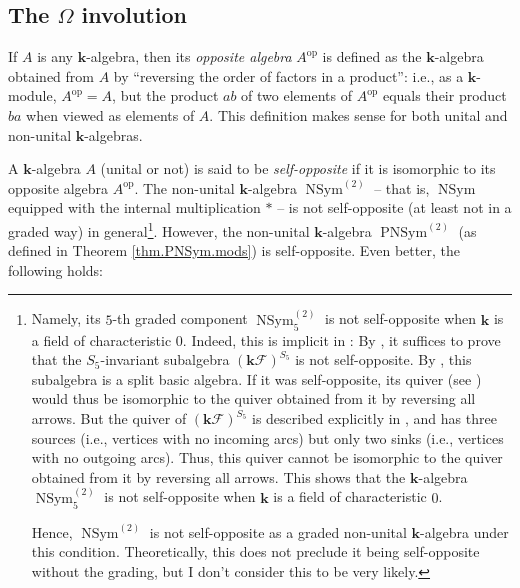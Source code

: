 \documentclass[numbers=enddot,12pt,final,onecolumn,notitlepage]{scrartcl}%
\theoremstyle{definition}
\begin{document}
\subsection{The $\Omega$ involution}

If $A$ is any $\mathbf{k}$-algebra, then its \emph{opposite algebra}
$A^{\operatorname*{op}}$ is defined as the $\mathbf{k}$-algebra obtained from
$A$ by \textquotedblleft reversing the order of factors in a
product\textquotedblright: i.e., as a $\mathbf{k}$-module,
$A^{\operatorname*{op}}=A$, but the product $ab$ of two elements of
$A^{\operatorname*{op}}$ equals their product $ba$ when viewed as elements of
$A$. This definition makes sense for both unital and non-unital $\mathbf{k}$-algebras.

A $\mathbf{k}$-algebra $A$ (unital or not) is said to be \emph{self-opposite}
if it is isomorphic to its opposite algebra $A^{\operatorname*{op}}$. The
non-unital $\mathbf{k}$-algebra $\operatorname*{NSym}\nolimits^{\left(
2\right)  }$ -- that is, $\operatorname*{NSym}$ equipped with the internal
multiplication $\ast$ -- is not self-opposite (at least not in a graded way)
in general\footnote{Namely, its $5$-th graded component $\operatorname*{NSym}%
\nolimits_{5}^{\left(  2\right)  }$ is not self-opposite when $\mathbf{k}$ is
a field of characteristic $0$. Indeed, this is implicit in \cite{Saliol08}: By
\cite[Theorem 2.1]{Saliol08}, it suffices to prove that the $S_{5}$-invariant
subalgebra $\left(  \mathbf{k}\mathcal{F}\right)  ^{S_{5}}$ is not
self-opposite. By \cite[Proposition 4.1]{Saliol08}, this subalgebra is a split
basic algebra. If it was self-opposite, its quiver (see \cite[\S 3]{Saliol08})
would thus be isomorphic to the quiver obtained from it by reversing all
arrows. But the quiver of $\left(  \mathbf{k}\mathcal{F}\right)  ^{S_{5}}$ is
described explicitly in \cite[Theorem 8.1]{Saliol08}, and has three sources
(i.e., vertices with no incoming arcs) but only two sinks (i.e., vertices with
no outgoing arcs). Thus, this quiver cannot be isomorphic to the quiver
obtained from it by reversing all arrows. This shows that the $\mathbf{k}%
$-algebra $\operatorname*{NSym}\nolimits_{5}^{\left(  2\right)  }$ is not
self-opposite when $\mathbf{k}$ is a field of characteristic $0$.
\par
Hence, $\operatorname*{NSym}\nolimits^{\left(  2\right)  }$ is not
self-opposite as a graded non-unital $\mathbf{k}$-algebra under this
condition. Theoretically, this does not preclude it being self-opposite
without the grading, but I don't consider this to be very likely.}. However,
the non-unital $\mathbf{k}$-algebra $\operatorname*{PNSym}\nolimits^{\left(
2\right)  }$ (as defined in Theorem \ref{thm.PNSym.mods}) is self-opposite.
Even better, the following holds:
\end{document}
